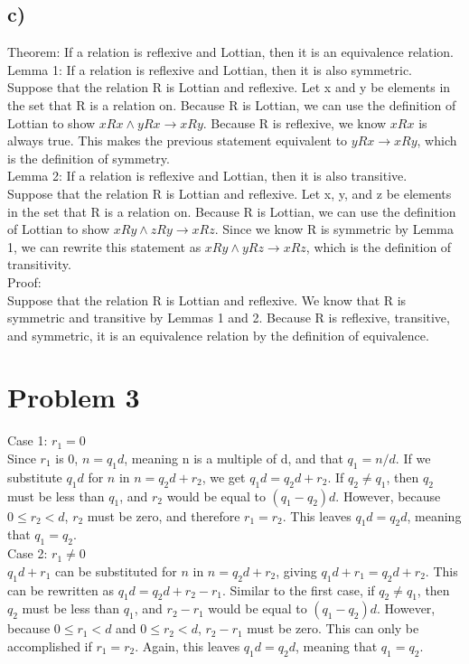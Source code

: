\documentclass{article}
\begin{document}
\subsection*{c)}
Theorem: If a relation is reflexive and Lottian, then it is an equivalence relation.\\
\newline
Lemma 1: If a relation is reflexive and Lottian, then it is also symmetric.\\
\newline
Suppose that the relation R is Lottian and reflexive. Let x and y be elements in the set that R is a relation on. Because R is Lottian, we can use the definition of Lottian to show $xRx \land yRx \rightarrow xRy$. Because R is reflexive, we know $xRx$ is always true. This makes the previous statement equivalent to $yRx \rightarrow xRy$, which is the definition of symmetry.\\
\clearpage
Lemma 2: If a relation is reflexive and Lottian, then it is also transitive.\\
\newline
Suppose that the relation R is Lottian and reflexive. Let x, y, and z be elements in the set that R is a relation on. Because R is Lottian, we can use the definition of Lottian to show $xRy \land zRy \rightarrow xRz$. Since we know R is symmetric by Lemma 1, we can rewrite this statement as $xRy \land yRz \rightarrow xRz$, which is the definition of transitivity.\\
\newline
Proof:\\
Suppose that the relation R is Lottian and reflexive. We know that R is symmetric and transitive by Lemmas 1 and 2. Because R is reflexive, transitive, and symmetric, it is an equivalence relation by the definition of equivalence.
\section*{Problem 3}
Case 1: $r_1 = 0$\\
Since $r_1$ is 0, $n=q_1d$, meaning n is a multiple of d, and that $q_1 = n/d$. If we substitute $q_1d$ for $n$ in $n=q_2d+r_2$, we get $q_1d=q_2d+r_2$. If $q_2 \neq q_1$, then $q_2$ must be less than $q_1$, and $r_2$ would be equal to $(q_1-q_2)d$. However, because $0 \leq r_2 < d$, $r_2$ must be zero, and therefore $r_1 = r_2$. This leaves $q_1d=q_2d$, meaning that $q_1=q_2$.\\
Case 2: $r_1 \neq 0$\\
$q_1d+r_1$ can be substituted for $n$ in $n=q_2d+r_2$, giving $q_1d+r_1=q_2d+r_2$. This can be rewritten as $q_1d=q_2d+r_2-r_1$. Similar to the first case, if $q_2 \neq q_1$, then $q_2$ must be less than $q_1$, and $r_2-r_1$ would be equal to $(q_1-q_2)d$. However, because $0 \leq r_1 < d$ and $0 \leq r_2 < d$, $r_2-r_1$ must be zero. This can only be accomplished if $r_1=r_2$. Again, this leaves $q_1d=q_2d$, meaning that $q_1=q_2$.
\end{document}
